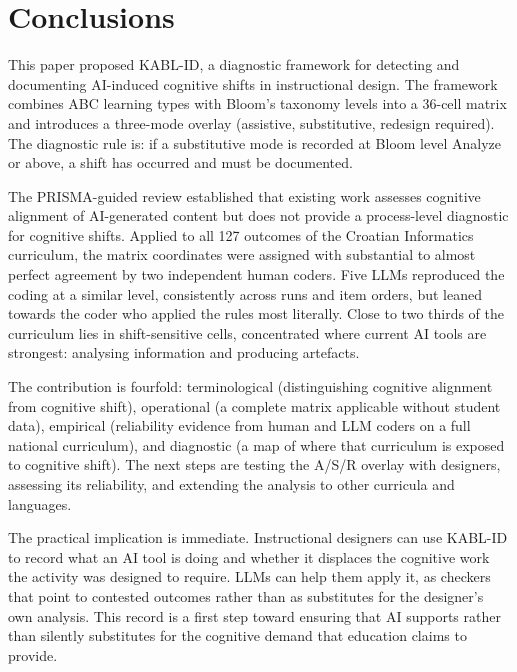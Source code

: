 \documentclass[journal,article,submit,pdftex,moreauthors]{Definitions/mdpi}
\begin{document}
\section{Conclusions}
\label{sec:conclusion}

This paper proposed KABL-ID, a diagnostic framework for detecting and documenting AI-induced cognitive shifts in instructional design. The framework combines ABC learning types with Bloom's taxonomy levels into a 36-cell matrix and introduces a three-mode overlay (assistive, substitutive, redesign required). The diagnostic rule is: if a substitutive mode is recorded at Bloom level Analyze or above, a shift has occurred and must be documented.

The PRISMA-guided review established that existing work assesses cognitive alignment of AI-generated content but does not provide a process-level diagnostic for cognitive shifts. Applied to all 127 outcomes of the Croatian Informatics curriculum, the matrix coordinates were assigned with substantial to almost perfect agreement by two independent human coders. Five LLMs reproduced the coding at a similar level, consistently across runs and item orders, but leaned towards the coder who applied the rules most literally. Close to two thirds of the curriculum lies in shift-sensitive cells, concentrated where current AI tools are strongest: analysing information and producing artefacts.

The contribution is fourfold: terminological (distinguishing cognitive alignment from cognitive shift), operational (a complete matrix applicable without student data), empirical (reliability evidence from human and LLM coders on a full national curriculum), and diagnostic (a map of where that curriculum is exposed to cognitive shift). The next steps are testing the A/S/R overlay with designers, assessing its reliability, and extending the analysis to other curricula and languages.

The practical implication is immediate. Instructional designers can use KABL-ID to record what an AI tool is doing and whether it displaces the cognitive work the activity was designed to require. LLMs can help them apply it, as checkers that point to contested outcomes rather than as substitutes for the designer's own analysis. This record is a first step toward ensuring that AI supports rather than silently substitutes for the cognitive demand that education claims to provide.

\vspace{6pt}
\end{document}
